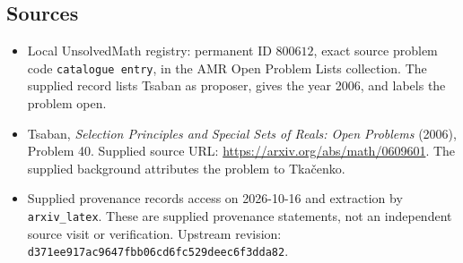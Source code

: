\documentclass[11pt]{article}
\begin{document}
\subsection{Sources}
\begin{itemize}
\item Local UnsolvedMath registry: permanent ID \(800612\), exact source problem code \texttt{catalogue entry}, in the AMR Open Problem Lists collection. The supplied record lists Tsaban as proposer, gives the year 2006, and labels the problem open.
\item Tsaban, \emph{Selection Principles and Special Sets of Reals: Open Problems} (2006), Problem 40. Supplied source URL: \url{https://arxiv.org/abs/math/0609601}. The supplied background attributes the problem to Tka\v{c}enko.
\item Supplied provenance records access on 2026-10-16 and extraction by \texttt{arxiv\_latex}. These are supplied provenance statements, not an independent source visit or verification. Upstream revision: \texttt{d371ee917ac9647fbb06cd6fc529deec6f3dda82}.
\end{itemize}
\end{document}
